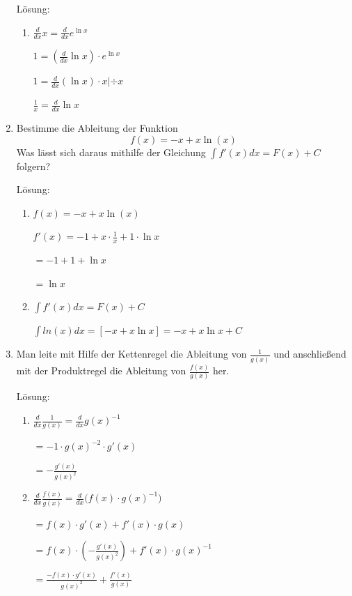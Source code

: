 \documentclass[main.tex]{subfiles}
\begin{document}
\begin{enumerate}
	      Lösung:
	      \begin{enumerate}
		      \item \( \frac{d}{dx} x = \frac{d}{dx} e^{\ln{x}} \)

		            \( 1 = (\frac{d}{dx} \ln{x}) \cdot e^{\ln{x}} \)

		            \( 1 = \frac{d}{dx}( \ln{x}) \cdot x  | \div x\)

		            \( \frac{1}{x} = \frac{d}{dx} \ln{x} \)
	      \end{enumerate}
	\item Bestimme die Ableitung der Funktion
	      \[ f(x) = -x + x \ln(x) \]
	      Was lässt sich daraus mithilfe der Gleichung
	      \( \int f'(x) dx = F(x) + C \) folgern?

	      Lösung:
	      \begin{enumerate}
		      \item \( f(x) = -x + x \ln(x) \)

		            \( f'(x) = -1 + x \cdot \frac{1}{x} + 1 \cdot \ln{x} \)

		            \( = -1 + 1 + \ln{x} \)

		            \( = \ln{x} \)

		      \item \( \int f'(x) dx = F(x) + C \)

		            \( \int ln(x) dx = [-x + x \ln{x}] = -x + x \ln{x} + C \)
	      \end{enumerate}
	\item Man leite mit Hilfe der Kettenregel die Ableitung von \( \frac{1}{ g(x) } \) und anschließend
	      mit der Produktregel die Ableitung von \( \frac{ f(x) }{ g(x) } \) her.

	      Lösung:
	      \begin{enumerate}
		      \item \( \frac{d}{dx} \frac{1}{g(x)} = \frac{d}{dx} g(x)^{-1} \)

		            \( = -1 \cdot g(x)^{-2} \cdot g'(x) \)

		            \( = - \frac{ g'(x) }{ g(x)^2 } \)
		      \item \( \frac{d}{dx} \frac{ f(x) }{ g(x) } = \frac{d}{dx} \Big( f(x) \cdot g(x)^{-1} \Big) \)

		            \( = f(x) \cdot g'(x) + f'(x) \cdot g(x) \)

		            \( = f(x) \cdot (- \frac{ g'(x) }{ g(x)^2 }) + f'(x) \cdot g(x)^{-1} \)

		            \( = \frac{- f(x) \cdot g'(x) }{ g(x)^2 } + \frac{f'(x) }{ g(x) } \)


\end{enumerate}
\end{enumerate}
\end{document}
